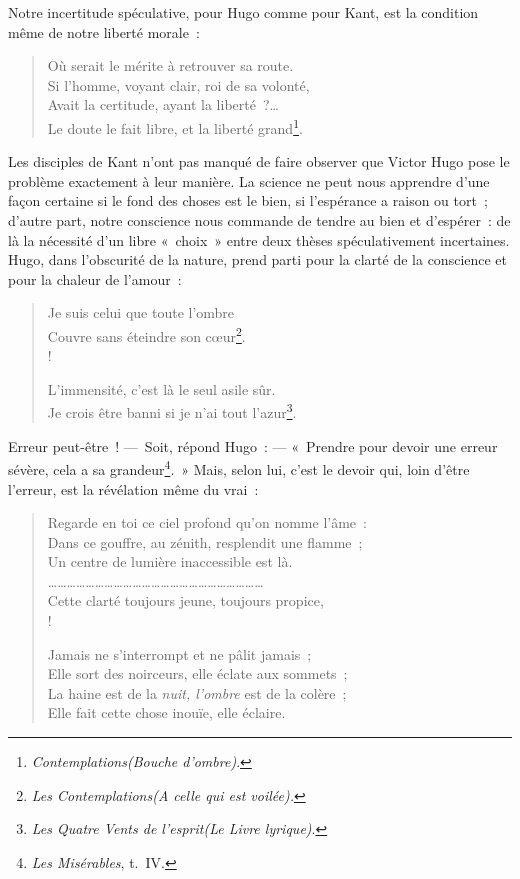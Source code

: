 \documentclass[french,twoside]{book} %
\begin{document}
\noindent Notre incertitude spéculative, pour Hugo comme pour Kant, est la condition même de notre liberté morale :\par


\begin{verse}
Où serait le mérite à retrouver sa route.\\
Si l’homme, voyant clair, roi de sa volonté,\\
Avait la certitude, ayant la liberté ?…\\
Le doute le fait libre, et la liberté grand\footnote{\emph{Contemplations(Bouche d’ombre)}.}.\\
\end{verse}

\noindent Les disciples de Kant n’ont pas manqué de faire observer que Victor Hugo pose le problème exactement à leur manière. La science ne peut nous apprendre d’une façon certaine si le fond des choses est le bien, si l’espérance a raison ou tort ; d’autre part, notre conscience nous commande de tendre au bien et d’espérer : de là la nécessité d’un libre « choix » entre deux thèses spéculativement incertaines. Hugo, dans l’obscurité de la nature, prend parti pour la clarté de la conscience et pour la chaleur de l’amour :\par


\begin{verse}
Je suis celui que toute l’ombre\\
Couvre sans éteindre son cœur\footnote{\emph{Les Contemplations(A celle qui est voilée).}}.\\!

L’immensité, c’est là le seul asile sûr.\\
Je crois être banni si je n’ai tout l’azur\footnote{\emph{Les Quatre Vents de l’esprit(Le Livre lyrique)}.}.\\
\end{verse}

\noindent Erreur peut-être ! — Soit, répond Hugo : — « Prendre pour devoir une erreur sévère, cela a sa grandeur\footnote{\emph{Les Misérables}, t. IV.}. » Mais, selon lui, c’est le devoir qui, loin d’être l’erreur, est la révélation même du vrai :\par


\begin{verse}
Regarde en toi ce ciel profond qu’on nomme l’âme :\\
Dans ce gouffre, au zénith, resplendit une flamme ;\\
Un centre de lumière inaccessible est là.\\
……………………………………………………………\\
Cette clarté toujours jeune, toujours propice,\\!

Jamais ne s’interrompt et ne pâlit jamais ;\\
Elle sort des noirceurs, elle éclate aux sommets ;\\
La haine est de la \emph{nuit, l’ombre} est de la colère ;\\
Elle fait cette chose inouïe, elle éclaire.\\
\end{verse}
\end{document}

